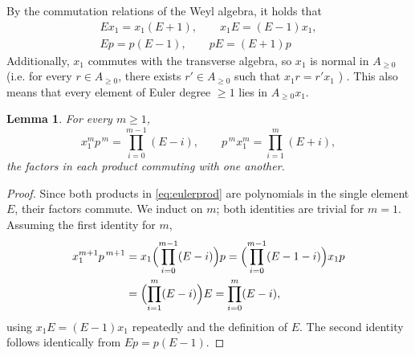 \documentclass[pdflatex,sn-mathphys-num]{sn-jnl}
\numberwithin{equation}{section}
\theoremstyle{thmstyleone}
\newtheorem{lemma}[theorem]{Lemma}
\theoremstyle{thmstyletwo}
\begin{document}
By the commutation relations of the Weyl algebra, it holds that
\begin{align}
    Ex_1=x_1(E+1),\qquad x_1E=(E-1)x_1,\nonumber \\
    Ep=p(E-1), \qquad pE=(E+1)p
    \label{eq:nonnegative-pbw}
\end{align}
Additionally, $x_1$ commutes with the transverse algebra, so $x_1$ is normal in $A_{\geq 0}$ (i.e. for every $r \in A_{\geq 0}$, there exists $r'\in A_{\geq 0}$ such that $x_1r=r'x_1$ \cite[4.1.10]{MR}) . This also means that every element of Euler degree $\ge1$ lies in $A_{\ge0}x_1$. 

\begin{lemma}\label{lem:euler}
For every $m\ge1$,
\begin{equation}\label{eq:eulerprod}
  x_1^{m}p^{\,m}=\prod_{i=0}^{m-1}(E-i), \qquad p^{\,m} x_1^{m}=\prod_{i=1}^{m}(E+i),
\end{equation}
the factors in each product commuting with one another.
\end{lemma}

\begin{proof}
Since both products in \eqref{eq:eulerprod} are polynomials in the single element $E$, their factors commute.
We induct on $m$; both identities are trivial for $m=1$. Assuming the
first identity for $m$,
\[\begin{aligned}
x_1^{m+1}p^{\,m+1}
 &=x_1\Bigl(\prod_{i=0}^{m-1}(E-i)\Bigr)p
 =\Bigl(\prod_{i=0}^{m-1}(E-1-i)\Bigr)x_1p\\
 &=\Bigl(\prod_{i=1}^{m}(E-i)\Bigr)E
 =\prod_{i=0}^{m}(E-i),
\end{aligned}\]
using $x_1E=(E-1)x_1$ repeatedly and the definition of $E$. The second identity follows
identically from $Ep=p(E-1)$.
\end{proof}
\end{document}
